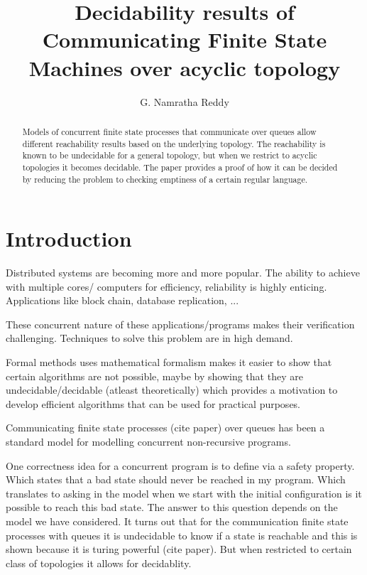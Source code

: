 \documentclass[a4paper,UKenglish,cleveref, autoref, thm-restate]{lipics-v2019}
\title{Decidability results of Communicating Finite
State Machines over acyclic topology } %
\author{G. Namratha Reddy}{Chennai Mathematical Institute, India \and  \url{http://www.cmi.ac.in/~namratha} }{}{}{}
\begin{document}
\maketitle

\begin{abstract}
    Models of concurrent finite state processes that communicate over queues allow different reachability results based on the underlying topology. The reachability is known to be undecidable for a general topology, but when we restrict to acyclic topologies it becomes decidable. The paper provides a proof of how it can be decided by reducing the problem to checking emptiness of a certain regular language. 
\end{abstract}

\section{Introduction}
\label{sec:typesetting-summary}

Distributed systems are becoming more and more popular. The ability to achieve with multiple cores/ computers for efficiency, reliability is highly enticing. Applications like block chain, database replication, ... 

These concurrent nature of these applications/programs makes their verification challenging. Techniques to solve this problem are in high demand. 

Formal methods uses mathematical formalism makes it easier to show that certain algorithms are not possible, maybe by showing that they are undecidable/decidable (atleast theoretically) which provides a motivation to develop efficient algorithms that can be used for practical purposes. 

Communicating finite state processes (cite paper) over queues has been a standard model for modelling concurrent non-recursive programs. 

One correctness idea for a concurrent program is to define via a safety property. Which states that a bad state should never be reached in my program. Which translates to asking in the model when we start with the initial configuration is it possible to reach this bad state. 
The answer to this question depends on the model we have considered. 
It turns out that for the communication finite state processes with queues it is undecidable to know if a state is reachable and this is shown because it is turing powerful (cite paper). But when restricted to certain class of topologies it allows for decidablity.
\end{document}

